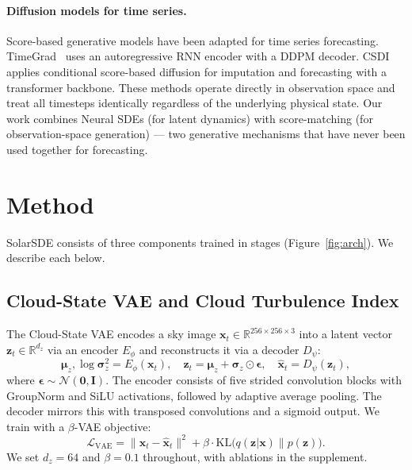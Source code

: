 \documentclass{article}
\begin{document}
\paragraph{Diffusion models for time series.}
Score-based generative models have been adapted for time series forecasting. TimeGrad~\citep{rasul2021timegrad} uses an autoregressive RNN encoder with a DDPM decoder. CSDI~\citep{tashiro2021csdi} applies conditional score-based diffusion for imputation and forecasting with a transformer backbone. These methods operate directly in observation space and treat all timesteps identically regardless of the underlying physical state. Our work combines Neural SDEs (for latent dynamics) with score-matching (for observation-space generation) --- two generative mechanisms that have never been used together for forecasting.

\section{Method}
\label{sec:method}

SolarSDE consists of three components trained in stages (Figure~\ref{fig:arch}). We describe each below.

\subsection{Cloud-State VAE and Cloud Turbulence Index}
\label{sec:csvae}

The Cloud-State VAE encodes a sky image $\mathbf{x}_t \in \mathbb{R}^{256 \times 256 \times 3}$ into a latent vector $\mathbf{z}_t \in \mathbb{R}^{d_z}$ via an encoder $E_\phi$ and reconstructs it via a decoder $D_\psi$:
\begin{equation}
    \boldsymbol{\mu}_z, \log \boldsymbol{\sigma}_z^2 = E_\phi(\mathbf{x}_t), \quad
    \mathbf{z}_t = \boldsymbol{\mu}_z + \boldsymbol{\sigma}_z \odot \boldsymbol{\epsilon}, \quad
    \hat{\mathbf{x}}_t = D_\psi(\mathbf{z}_t),
\end{equation}
where $\boldsymbol{\epsilon} \sim \mathcal{N}(\mathbf{0}, \mathbf{I})$. The encoder consists of five strided convolution blocks with GroupNorm and SiLU activations, followed by adaptive average pooling. The decoder mirrors this with transposed convolutions and a sigmoid output. We train with a $\beta$-VAE objective:
\begin{equation}
    \mathcal{L}_{\text{VAE}} = \|\mathbf{x}_t - \hat{\mathbf{x}}_t\|^2 + \beta \cdot \text{KL}\big(q(\mathbf{z}|\mathbf{x}) \| p(\mathbf{z})\big).
\end{equation}
We set $d_z = 64$ and $\beta = 0.1$ throughout, with ablations in the supplement.
\end{document}
